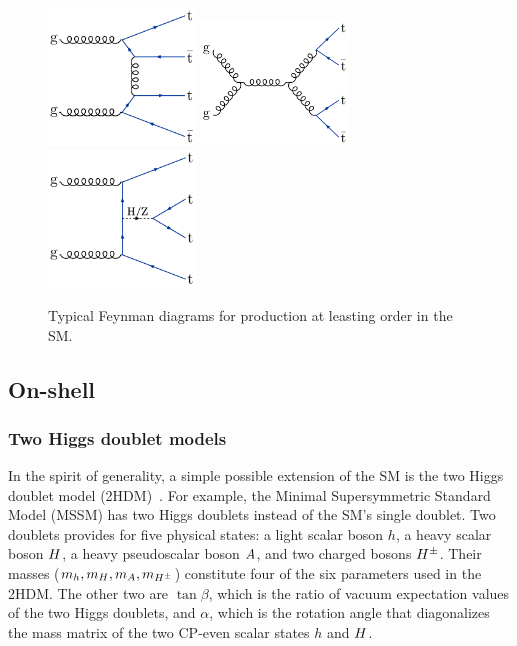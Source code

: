 \begin{figure}[!hbtp]
\centering
\includegraphics[width=0.35\textwidth]{figs/ftp/ftdiag1.pdf}
\includegraphics[width=0.35\textwidth]{figs/ftp/ftdiag2.pdf} \\
\includegraphics[width=0.35\textwidth]{figs/ftp/ftdiag4.pdf}
\caption{Typical Feynman diagrams for \tttt production at leasting order in the SM.}
\label{fig:ftdiags}
\end{figure}

\subsection{On-shell}

\subsubsection{Two Higgs doublet models}
\label{sec:ft2hdm}

In the spirit of generality, a simple possible extension of the SM 
is the two Higgs doublet model (2HDM)~\cite{THEORY:Branco2011iw}.
For example, the Minimal Supersymmetric Standard Model (MSSM)
has two Higgs doublets instead of the SM's single doublet.
Two doublets provides for five physical states: 
a light scalar boson $h$, a heavy scalar boson $H$, a heavy pseudoscalar boson $A$, and
two charged bosons $H^\pm$. Their masses ($m_h, m_H, m_A, m_{H^\pm}$)
constitute four of the six parameters used in the 2HDM. The other two are $\tan\beta$,
which is the ratio of vacuum expectation values of the two Higgs doublets,
and $\alpha$, which is the rotation angle that diagonalizes the mass matrix of the
two CP-even scalar states $h$ and $H$.

